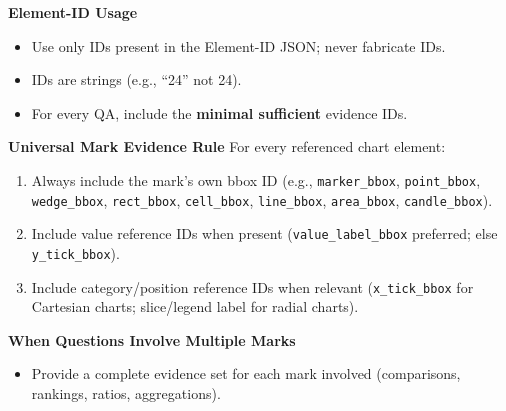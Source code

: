 \begin{tcolorbox}[myprompt, title=Chart QA Prompt -- Evidence \& Grounding Rules]

    \textbf{Element-ID Usage}
    \begin{itemize}
      \item Use only IDs present in the Element-ID JSON; never fabricate IDs.
      \item IDs are strings (e.g., ``24'' not 24).
      \item For every QA, include the \textbf{minimal sufficient} evidence IDs.
    \end{itemize}
    
    \medskip
    \textbf{Universal Mark Evidence Rule}
    For every referenced chart element:
    \begin{enumerate}
        \item Always include the mark’s own bbox ID
              (e.g., \texttt{marker\_bbox}, \texttt{point\_bbox}, \texttt{wedge\_bbox}, 
              \texttt{rect\_bbox}, \texttt{cell\_bbox}, \texttt{line\_bbox}, 
              \texttt{area\_bbox}, \texttt{candle\_bbox}).
        \item Include value reference IDs when present  
              (\texttt{value\_label\_bbox} preferred; else \texttt{y\_tick\_bbox}).
        \item Include category/position reference IDs when relevant  
              (\texttt{x\_tick\_bbox} for Cartesian charts; slice/legend label for radial charts).
    \end{enumerate}
    
    \medskip
    \textbf{When Questions Involve Multiple Marks}
    \begin{itemize}
      \item Provide a complete evidence set for each mark involved 
            (comparisons, rankings, ratios, aggregations).
    \end{itemize}
    

\end{tcolorbox}
